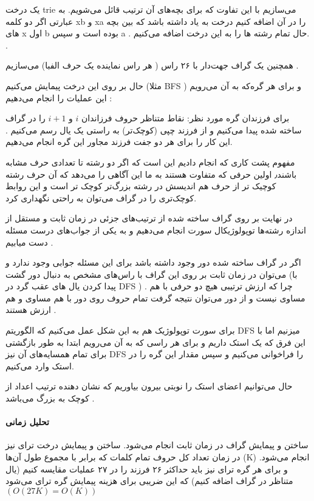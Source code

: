 %	


یک درخت 
trie 
می‌سازیم با این تفاوت
که برای بچه‌های آن ترتیب 
قائل می‌شویم.
به عبارتی
اگر دو کلمه 
xb 
و 
xa 
را در آن اضافه کنیم درخت به یاد 
داشته باشد که بین بچه های 
x 
اول 
b 
بوده است و سپس 
a
.
حال تمام رشته ها را به این درخت اضافه می‌کنیم.
.

همچنین یک گراف جهت‌دار با ۲۶ راس 
( هر راس نماینده یک حرف الفبا) 
می‌سازیم
.

حال بر روی این درخت پیمایش می‌کنیم
(مثلا 
BFS
)
و برای هر گره‌که به آن می‌رویم این عملیات را انجام می‌دهیم
:

برای فرزندان گره مورد نظر:
نقاط متناظر حروف فرزاندان 
$i$ 
و
$i+1$
را در گراف ساخته شده پیدا می‌کنیم 
و
از فرزند چپی (کوچک‌تر) به راستی یک یال رسم می‌کنیم
.
این کار را برای هر دو جفت فرزند مجاور این گره انجام می‌دهیم.

مفهوم
 پشت کاری که انجام دادیم این است که اگر دو
 رشته تا تعدادی حرف مشابه باشند٫ 
 اولین حرفی که متفاوت هستند 
 به ما این آگاهی را می‌دهد 
 که آن حرف رشته کوچیک تر از حرف هم اندیسش در رشته بزرگ‌تر کوچک تر است
 و
  این روابط کوچک‌تری را در گراف می‌توان به راحتی نگهداری کرد.

  در نهایت بر روی گراف ساخته شده از ترتیب‌های جزئی در زمان ثابت و مستقل از اندازه رشته‌ها توپولوژیکال سورت انجام می‌دهیم 
  و به یکی از جواب‌های درست مسئله دست میابیم
  .

  اگر در گراف ساخته شده دور وجود داشته باشد برای این مسئله جوابی وجود ندارد 
  و می‌توان در زمان ثابت 
  بر روی این گراف با راس‌های مشخص به دنبال دور گشت
  (با پیدا کردن یال های عقب گرد در 
  DFS
  ) .
  چرا که ارزش ترتیبی هیچ دو حرفی با هم مساوی نیست 
  و 
  از دور می‌توان نتیجه گرفت تمام حروف روی دور با هم مساوی و هم ارزش هستند
  .


  برای سورت توپولوژیک هم 
  به این شکل عمل می‌کنیم که الگوریتم 
  DFS 
  میزنیم اما با این فرق که 
  یک استک داریم و برای هر راسی 
  که به آن می‌رویم ابتدا 
  به طور بازگشتی برای تمام همسایه‌های آن 
  نیز  
  DFS
  را فراخوانی می‌کنیم 
  و
   سپس مقدار این گره را
   در استک وارد می‌کنیم.

   حال می‌توانیم اعضای استک را نوبتی بیرون بیاوریم
   که نشان دهنده ترتیب اعداد از کوچک به بزرگ می‌باشد
   .


   \paragraph{تحلیل زمانی}
   ساختن و پیمایش گراف در زمان ثابت انجام می‌شود.
    ساختن و پیمایش درخت ترای نیز در زمان
    تعداد کل حروف تمام کلمات
    که برابر با مجموع طول آن‌ها 
    (K) 
    انجام می‌شود.
    و برای هر گره ترای نیز باید 
    حداکثر
    ۲۶ 
    فرزند را 
    در ۲۷ 
    عملیات مقایسه کنیم 
    (یال متناظر در گراف اضافه کنیم)
    که این ضریبی برای هزینه پیمایش گره ترای می‌شود
    $(O(27K) = O(K))$

